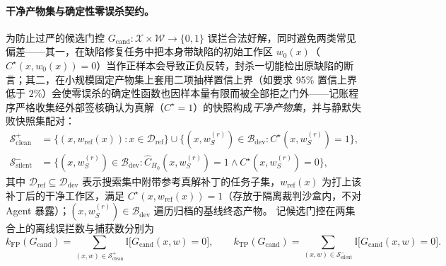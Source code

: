 \documentclass[UTF8,a4paper,10.5pt]{ctexart}
\newcommand{\Ddev}{\mathcal{D}_{\mathrm{dev}}}
\newcommand{\Sclean}{\mathcal{S}^+_{\mathrm{clean}}}
\newcommand{\Ssilent}{\mathcal{S}^-_{\mathrm{silent}}}
\newcommand{\Ind}{\mathbb{I}}
\begin{document}
\paragraph{干净产物集与确定性零误杀契约。}
为防止过严的候选门控 $G_{\mathrm{cand}}:\mathcal{X}\times\mathcal{W}\to\{0,1\}$ 误拦合法好解，同时避免两类常见偏差——其一，在缺陷修复任务中把本身带缺陷的初始工作区 $w_0(x)$（$C^\star(x,w_0(x))=0$）当作正样本会导致正负反转，封杀一切能检出原缺陷的断言；其二，在小规模固定产物集上套用二项抽样置信上界（如要求 95\% 置信上界低于 $2\%$）会使零误杀的确定性函数也因样本量有限而被全部拒之门外——记账程序严格收集经外部签核确认为真解（$C^\star=1$）的快照构成\emph{干净产物集}，并与静默失败快照集配对：
\begin{align}
  \Sclean &= \bigl\{(x, w_{\mathrm{ref}}(x)) : x\in\mathcal{D}_{\mathrm{ref}}\bigr\}
             \cup \bigl\{(x, w^{(r)}_S)\in\mathcal{B}_{\mathrm{dev}} : C^\star(x,w^{(r)}_S)=1\bigr\}, \\
  \Ssilent &= \bigl\{(x, w^{(r)}_S)\in\mathcal{B}_{\mathrm{dev}} : \hat{C}_{H_0}(x,w^{(r)}_S)=1 \land C^\star(x,w^{(r)}_S)=0\bigr\},
\end{align}
其中 $\mathcal{D}_{\mathrm{ref}}\subseteq\Ddev$ 表示搜索集中附带参考真解补丁的任务子集，$w_{\mathrm{ref}}(x)$ 为打上该补丁后的干净工作区，满足 $C^\star(x,w_{\mathrm{ref}}(x))=1$（存放于隔离裁判沙盒内，不对 Agent 暴露）；$(x,w^{(r)}_S)\in\mathcal{B}_{\mathrm{dev}}$ 遍历归档的基线终态产物。
记候选门控在两集合上的离线误拦数与捕获数分别为
\begin{equation}
  k_{\mathrm{FP}}(G_{\mathrm{cand}})=\sum_{(x,w)\in\Sclean}\Ind\bigl[G_{\mathrm{cand}}(x,w)=0\bigr],\qquad
  k_{\mathrm{TP}}(G_{\mathrm{cand}})=\sum_{(x,w)\in\Ssilent}\Ind\bigl[G_{\mathrm{cand}}(x,w)=0\bigr].
\end{equation}
\end{document}
